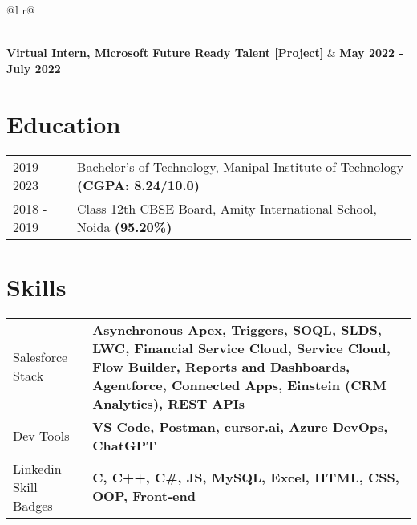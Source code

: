 \documentclass[a4paper,12pt]{article}
\begin{document}
\begin{tabularx}{\linewidth}{ @{}l r@{} }
{\begin{minipage}[t]{\linewidth}
\begin{itemize}[nosep,after=\strut, leftmargin=1em, itemsep=2pt]
    \end{itemize}
    \end{minipage}
}  \\ [-1em]
\textbf{Virtual Intern, Microsoft Future Ready Talent [Project]} & \hfill \textbf{May 2022 - July 2022} \\[3.75pt]
\end{tabularx}
\section{Education}
\begin{tabularx}{\linewidth}{@{}l X@{}}
2019 - 2023 & Bachelor's of Technology, Manipal Institute of Technology \hfill \textbf{(CGPA: 8.24/10.0)} \\
2018 - 2019 & Class 12th CBSE Board, Amity International School, Noida \hfill \textbf{(95.20\%)} \\
\end{tabularx}
\section{Skills}
\begin{tabularx}{\linewidth}{@{}l X@{}}
Salesforce Stack & \normalsize \textbf{Asynchronous Apex, Triggers, SOQL, SLDS, LWC, Financial Service Cloud, Service Cloud, Flow Builder, Reports and Dashboards, Agentforce, Connected Apps, Einstein (CRM Analytics), REST APIs} \\
Dev Tools & \normalsize \textbf{VS Code, Postman, cursor.ai, Azure DevOps, ChatGPT} \\
Linkedin Skill Badges & \normalsize \textbf {C, C++, C\#, JS, MySQL, Excel, HTML, CSS, OOP, Front-end}\\
\end{tabularx}
\end{document}
